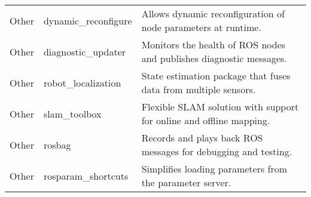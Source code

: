 \documentclass[../../main]{subfiles}
\begin{document}
\begin{longtable}{|>{\raggedright\arraybackslash}p{4cm}|>{\raggedright\arraybackslash}p{4cm}|p{7cm}|}
Other & dynamic\_reconfigure & Allows dynamic reconfiguration of node parameters at runtime. \\
Other & diagnostic\_updater & Monitors the health of ROS nodes and publishes diagnostic messages. \\
Other & robot\_localization & State estimation package that fuses data from multiple sensors. \\
Other & slam\_toolbox & Flexible SLAM solution with support for online and offline mapping. \\
Other & rosbag & Records and plays back ROS messages for debugging and testing. \\
Other & rosparam\_shortcuts & Simplifies loading parameters from the parameter server. \\

\end{longtable}
\end{document}
